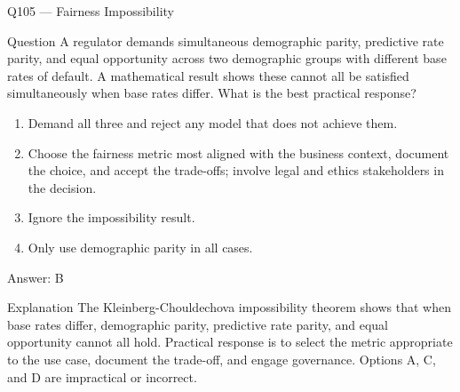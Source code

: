 \documentclass[aspectratio=169,8pt]{beamer}
\begin{document}
\begin{frame}{Q105 --- Fairness Impossibility}
\begin{block}{Question}
A regulator demands simultaneous demographic parity, predictive rate parity, and equal opportunity across two demographic groups with different base rates of default. A mathematical result shows these cannot all be satisfied simultaneously when base rates differ. What is the best practical response?
\end{block}
\begin{enumerate}
\item Demand all three and reject any model that does not achieve them.
\item Choose the fairness metric most aligned with the business context, document the choice, and accept the trade-offs; involve legal and ethics stakeholders in the decision.
\item Ignore the impossibility result.
\item Only use demographic parity in all cases.
\end{enumerate}
\begin{exampleblock}{Answer: B}\end{exampleblock}
\begin{block}{Explanation}
The Kleinberg-Chouldechova impossibility theorem shows that when base rates differ, demographic parity, predictive rate parity, and equal opportunity cannot all hold. Practical response is to select the metric appropriate to the use case, document the trade-off, and engage governance. Options A, C, and D are impractical or incorrect.
\end{block}
\end{frame}
\end{document}
